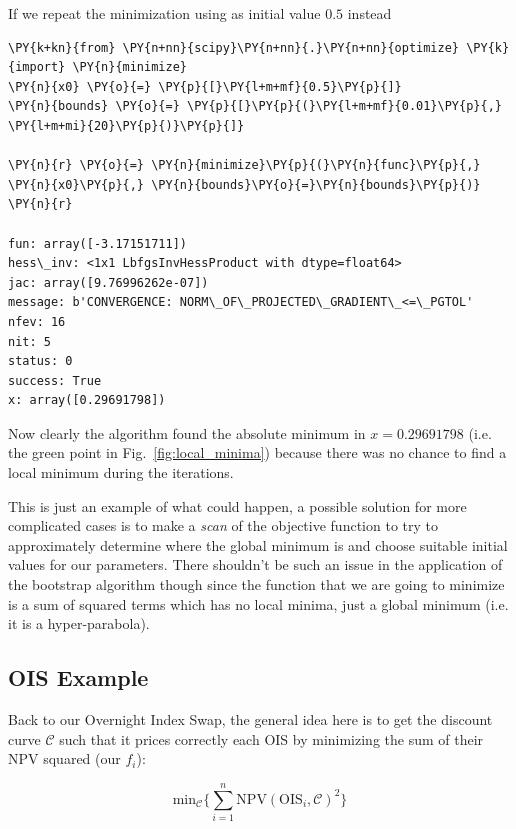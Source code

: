 If we repeat the minimization using as initial value $0.5$ instead
\begin{tcolorbox}[breakable, size=fbox, boxrule=1pt, pad at break*=1mm,colback=cellbackground, colframe=cellborder]
\begin{Verbatim}[commandchars=\\\{\}]
\PY{k+kn}{from} \PY{n+nn}{scipy}\PY{n+nn}{.}\PY{n+nn}{optimize} \PY{k}{import} \PY{n}{minimize}
\PY{n}{x0} \PY{o}{=} \PY{p}{[}\PY{l+m+mf}{0.5}\PY{p}{]}
\PY{n}{bounds} \PY{o}{=} \PY{p}{[}\PY{p}{(}\PY{l+m+mf}{0.01}\PY{p}{,} \PY{l+m+mi}{20}\PY{p}{)}\PY{p}{]}
		
\PY{n}{r} \PY{o}{=} \PY{n}{minimize}\PY{p}{(}\PY{n}{func}\PY{p}{,} \PY{n}{x0}\PY{p}{,} \PY{n}{bounds}\PY{o}{=}\PY{n}{bounds}\PY{p}{)}
\PY{n}{r}

fun: array([-3.17151711])
hess\_inv: <1x1 LbfgsInvHessProduct with dtype=float64>
jac: array([9.76996262e-07])
message: b'CONVERGENCE: NORM\_OF\_PROJECTED\_GRADIENT\_<=\_PGTOL'
nfev: 16
nit: 5
status: 0
success: True
x: array([0.29691798])
\end{Verbatim}
\end{tcolorbox}
Now clearly the algorithm found the absolute minimum in $x=0.29691798$ (i.e. the green point in Fig.~\ref{fig:local_minima}) because there was no chance to find a local minimum during the iterations.

This is just an example of what could happen, a possible solution for more complicated cases is to make a \emph{scan} of the objective function to try to approximately determine where the global minimum is and choose suitable initial values for our parameters.
There shouldn't be such an issue in the application of the bootstrap algorithm though since the function that we are going to minimize is a sum of squared terms which has no local minima, just a global minimum (i.e. it is a hyper-parabola).

\subsection{OIS Example}\label{ois-example}
Back to our Overnight Index Swap, the general idea here is to get the discount curve \(\mathcal{C}\) such that it prices correctly each OIS by minimizing the sum of their NPV squared (our \(f_i\)):

\begin{equation}
\mathrm{min}_{\mathcal{C}} \Big\{\sum_{i=1}^{n}\mathrm{NPV}(\mathrm{OIS}_i, \mathcal{C})^2\Big\}
\end{equation}

